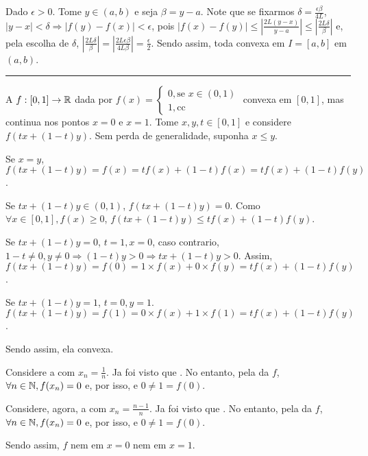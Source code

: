 Dado $\epsilon > 0$. Tome $y \in (a,b)$ e seja $\beta = y-a$. Note que se fixarmos $\delta = \frac{\epsilon\beta}{4L}$, \entao $|y-x|<\delta \Rightarrow |f(y)-f(x)|<\epsilon$, pois $|f(x)-f(y)| \leq |\frac{2L(y-x)}{y-a}| \leq |\frac{2L\delta}{\beta}|$ e, pela escolha de $\delta$, $|\frac{2L\delta}{\beta}| = |\frac{2L\epsilon\beta}{4L\beta}| = \frac{\epsilon}{2}$. Sendo assim, toda \funcao convexa em $I = [a,b]$ \eh \continua em $(a,b)$.

\vspace{1cm}
\hrule
\vspace{1cm}

A \funcao $f:[0,1]\rightarrow\mathbb{R}$ dada por
$f(x) = \begin{cases*}
	0, \text{se } x\in (0,1) \\
	1, \text{cc}
\end{cases*}$ \eh convexa em $[0,1]$, mas \nao \eh continua nos pontos $x=0$ e $x=1$. Tome $x,y,t \in [0,1]$ e considere $f(tx + (1-t)y)$. Sem perda de generalidade, suponha $x \le y$.

Se $x = y$, $f(tx + (1-t)y) = f(x) = tf(x) + (1-t)f(x) = tf(x) + (1-t)f(y)$.

Se $tx + (1-t)y \in (0,1)$, $f(tx + (1-t)y) = 0$. Como $\forall x \in [0,1], f(x) \ge 0$, \entao $f(tx + (1-t)y) \le tf(x) + (1-t)f(y)$.

Se $tx + (1-t)y = 0$, \entao $t = 1, x = 0$, caso contrario, $1-t \neq 0, y \neq 0 \Rightarrow (1-t)y > 0 \Rightarrow tx + (1-t)y>0$. Assim, $f(tx + (1-t)y) = f(0) = 1\times f(x) + 0 \times f(y) = tf(x) + (1-t)f(y)$.


Se $tx + (1-t)y = 1$, \entao $t = 0, y = 1$. $f(tx + (1-t)y) = f(1) = 0\times f(x) + 1 \times f(1) = tf(x) + (1-t)f(y)$.

Sendo assim, ela \eh convexa.

Considere a \sequencia {} com $x_n = \frac{1}{n}$. Ja foi visto que . No entanto, pela  da $f$, $\forall n \in \mathbb{N}, f(x_n) = 0$ e, por isso,  e $0\neq 1 = f(0)$.

Considere, agora, a \sequencia {} com $x_n = \frac{n-1}{n}$. Ja foi visto que . No entanto, pela  da $f$, $\forall n \in \mathbb{N}, f(x_n) = 0$ e, por isso,  e $0\neq 1 = f(0)$.

Sendo assim, $f$ \nao \eh \continua nem em $x=0$ nem em $x=1$.





